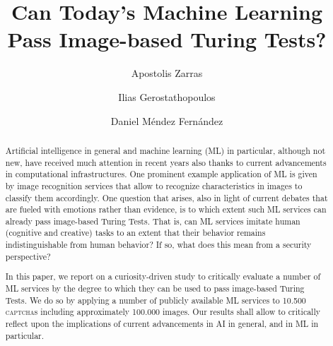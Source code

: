 \documentclass[sigconf,review,anonymous]{acmart}
\newcommand{\captchas}{\textsc{captcha}s\xspace}
\begin{document}
\title{Can Today's Machine Learning Pass Image-based Turing Tests?}

\author{Apostolis Zarras}

\author{Ilias Gerostathopoulos}

\author{Daniel M\'endez Fern\'andez}

\renewcommand{\shortauthors}{A. Zarras et al.}

%
%


\begin{abstract}
Artificial intelligence in general and machine learning (ML) in particular, although not new, have received much attention in recent years also thanks to current advancements in computational infrastructures. One prominent example application of ML is given by image recognition services that allow to recognize characteristics in images to classify them accordingly. One question that arises, also in light of current debates that are fueled with emotions rather than evidence, is to which extent such ML services can already pass image-based Turing Tests. That is, can ML services imitate human (cognitive and creative) tasks to an extent that their behavior remains indistinguishable from human behavior? If so, what does this mean from a security perspective?

In this paper, we report on a curiosity-driven study to critically evaluate a number of ML services by the degree to which they can be used to pass image-based Turing Tests. We do so by applying a number of publicly available ML services to 10.500 \captchas including approximately 100.000 images. Our results shall allow to critically reflect upon the implications of current advancements in AI in general, and in ML in particular.

\end{abstract}

\end{document}
